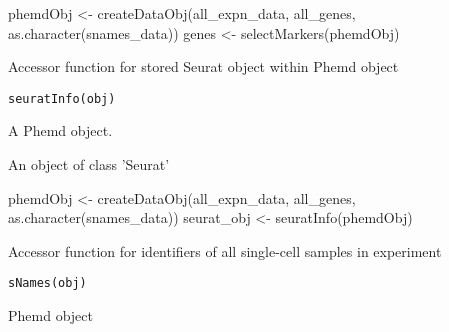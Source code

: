 \documentclass[a4paper]{book}
\begin{document}
%
\begin{Examples}
\begin{ExampleCode}
phemdObj <- createDataObj(all_expn_data, all_genes, as.character(snames_data))
genes <- selectMarkers(phemdObj)

\end{ExampleCode}
\end{Examples}
%
\begin{Description}\relax
Accessor function for stored Seurat object within Phemd object
\end{Description}
%
\begin{Usage}
\begin{verbatim}
seuratInfo(obj)
\end{verbatim}
\end{Usage}
%
\begin{Arguments}
\begin{ldescription}
\item[\code{obj}] A Phemd object.
\end{ldescription}
\end{Arguments}
%
\begin{Value}
An object of class 'Seurat'
\end{Value}
%
\begin{Examples}
\begin{ExampleCode}
phemdObj <- createDataObj(all_expn_data, all_genes, as.character(snames_data))
seurat_obj <- seuratInfo(phemdObj)

\end{ExampleCode}
\end{Examples}
%
\begin{Description}\relax
Accessor function for identifiers of all single-cell samples in experiment
\end{Description}
%
\begin{Usage}
\begin{verbatim}
sNames(obj)
\end{verbatim}
\end{Usage}
%
\begin{Arguments}
\begin{ldescription}
\item[\code{obj}] Phemd object
\end{ldescription}
\end{Arguments}
\end{document}
